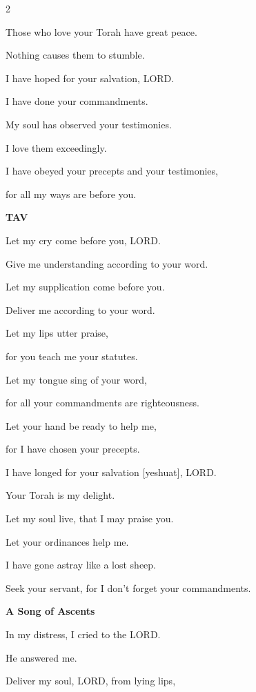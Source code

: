 \begin{multicols}{2}
	
	\myverse{}Those who love your Torah have great peace.
	
	Nothing causes them to stumble.
	
	
	\myverse{}I have hoped for your salvation, LORD.
	
	I have done your commandments.
	
	
	\myverse{}My soul has observed your testimonies.
	
	I love them exceedingly.
	
	
	\myverse{}I have obeyed your precepts and your testimonies,
	
	for all my ways are before you.
	
	\vspace{\baselineskip}
	
	\textbf{TAV}
	
	
	\myverse{}Let my cry come before you, LORD.
	
	Give me understanding according to your word.
	
	
	\myverse{}Let my supplication come before you.
	
	Deliver me according to your word.
	
	
	\myverse{}Let my lips utter praise,
	
	for you teach me your statutes.
	
	
	\myverse{}Let my tongue sing of your word,
	
	for all your commandments are righteousness.
	
	
	\myverse{}Let your hand be ready to help me,
	
	for I have chosen your precepts.
	
	
	\myverse{}I have longed for your salvation [yeshuat], LORD.
	
	Your Torah is my delight.
	
	
	\myverse{}Let my soul live, that I may praise you.
	
	Let your ordinances help me.
	
	
	\myverse{}I have gone astray like a lost sheep.
	
	Seek your servant, for I don’t forget your commandments.
	
	
	\mychapter{}\textbf{A Song of Ascents}
	
	\quad\quad\quad \myverse*{}In my distress, I cried to the LORD.
	
	\quad\quad\quad He answered me.
	
	
	\myverse{}Deliver my soul, LORD, from lying lips,
	

\end{multicols}

